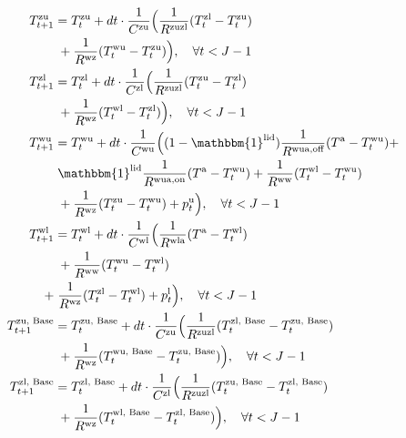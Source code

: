 \documentclass[conference]{IEEEtran}
\begin{document}
{\begin{subequations}
\begin{align}
        T^{\text{zu}}_{t+1} & = T^{\text{zu}}_{t} + dt \cdot \frac{1}{C^{\text{zu}}}\Bigl( \frac{1}{R^{\text{zuzl}}} (T^{\text{zl}}_{t} - T^{\text{zu}}_{t}) \notag                                     \\ & \mspace{5mu} + \frac{1}{R^{\text{wz}}} (T^{\text{wu}}_{t} - T^{\text{zu}}_{t}) \Bigr), \quad \forall{t} < J-1 \label{P2:StateSpace1} \\
        T^{\text{zl}}_{t+1} & = T^{\text{zl}}_{t} + dt \cdot \frac{1}{C^{\text{zl}}}\Bigl( \frac{1}{R^{\text{zuzl}}} (T^{\text{zu}}_{t} - T^{\text{zl}}_{t}) \notag                                     \\ & \mspace{5mu} + \frac{1}{R^{\text{wz}}} (T^{\text{wl}}_{t} - T^{\text{zl}}_{t}) \Bigr), \quad \forall{t} < J-1 \label{P2:StateSpace2} \\
        T^{\text{wu}}_{t+1} & = T^{\text{wu}}_{t} + dt \cdot \frac{1}{C^{\text{wu}}}\Bigl( (1-\mathbbm{1}^{\text{lid}}) \frac{1}{R^{\text{wua},\text{off}}} (T^{\text{a}} - T^{\text{wu}}_{t}) \notag + \\ & \mspace{5mu} \mathbbm{1}^{\text{lid}} \frac{1}{R^{\text{wua},\text{on}}} (T^{\text{a}} - T^{\text{wu}}_{t}) + \frac{1}{R^{\text{ww}}} (T^{\text{wl}}_{t} - T^{\text{wu}}_{t}) \notag \\ & \mspace{5mu} + \frac{1}{R^{\text{wz}}} (T^{\text{zu}}_{t} - T^{\text{wu}}_{t}) + p^{\text{u}}_{t} \Bigr), \quad \forall{t} < J-1 \label{P2:StateSpace3} \\
        T^{\text{wl}}_{t+1} & = T^{\text{wl}}_{t} + dt \cdot \frac{1}{C^{\text{wl}}}\Bigl( \frac{1}{R^{\text{wla}}} (T^{\text{a}} - T^{\text{wl}}_{t}) \notag                                           \\ & \mspace{5mu} + \frac{1}{R^{\text{ww}}} (T^{\text{wu}}_{t} - T^{\text{wl}}_{t})  \notag \\
        + & \mspace{5mu} \frac{1}{R^{\text{wz}}} (T^{\text{zl}}_{t} - T^{\text{wl}}_{t}) + p^{\text{l}}_{t} \Bigr), \quad \forall{t} < J-1 \label{P2:StateSpace4} \\
        T^{\text{zu, Base}}_{t+1} & = T^{\text{zu, Base}}_{t} + dt \cdot \frac{1}{C^{\text{zu}}}\Bigl( \frac{1}{R^{\text{zuzl}}} (T^{\text{zl, Base}}_{t} - T^{\text{zu, Base}}_{t}) \notag                                     \\ & \mspace{5mu} + \frac{1}{R^{\text{wz}}} (T^{\text{wu, Base}}_{t} - T^{\text{zu, Base}}_{t}) \Bigr), \quad \forall{t} < J-1 \label{P2:StateSpaceBase1} \\
        T^{\text{zl, Base}}_{t+1} & = T^{\text{zl, Base}}_{t} + dt \cdot \frac{1}{C^{\text{zl}}}\Bigl( \frac{1}{R^{\text{zuzl}}} (T^{\text{zu, Base}}_{t} - T^{\text{zl, Base}}_{t}) \notag                                     \\ & \mspace{5mu} + \frac{1}{R^{\text{wz}}} (T^{\text{wl, Base}}_{t} - T^{\text{zl, Base}}_{t}) \Bigr), \quad \forall{t} < J-1 \label{P2:StateSpaceBase2} \\

\end{align}
\end{subequations}}
\end{document}
